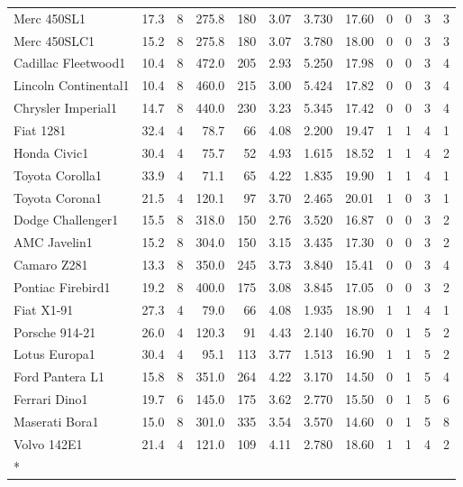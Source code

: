 \documentclass[a4paper, nobind]{templates/ociamthesis}
\begin{document}
\begin{landscape}
\begin{longtable}{lrrrrrrrrrrr}
Merc 450SL1 & 17.3 & 8 & 275.8 & 180 & 3.07 & 3.730 & 17.60 & 0 & 0 & 3 & 3\\
\addlinespace
Merc 450SLC1 & 15.2 & 8 & 275.8 & 180 & 3.07 & 3.780 & 18.00 & 0 & 0 & 3 & 3\\
Cadillac Fleetwood1 & 10.4 & 8 & 472.0 & 205 & 2.93 & 5.250 & 17.98 & 0 & 0 & 3 & 4\\
Lincoln Continental1 & 10.4 & 8 & 460.0 & 215 & 3.00 & 5.424 & 17.82 & 0 & 0 & 3 & 4\\
Chrysler Imperial1 & 14.7 & 8 & 440.0 & 230 & 3.23 & 5.345 & 17.42 & 0 & 0 & 3 & 4\\
Fiat 1281 & 32.4 & 4 & 78.7 & 66 & 4.08 & 2.200 & 19.47 & 1 & 1 & 4 & 1\\
\addlinespace
Honda Civic1 & 30.4 & 4 & 75.7 & 52 & 4.93 & 1.615 & 18.52 & 1 & 1 & 4 & 2\\
Toyota Corolla1 & 33.9 & 4 & 71.1 & 65 & 4.22 & 1.835 & 19.90 & 1 & 1 & 4 & 1\\
Toyota Corona1 & 21.5 & 4 & 120.1 & 97 & 3.70 & 2.465 & 20.01 & 1 & 0 & 3 & 1\\
Dodge Challenger1 & 15.5 & 8 & 318.0 & 150 & 2.76 & 3.520 & 16.87 & 0 & 0 & 3 & 2\\
AMC Javelin1 & 15.2 & 8 & 304.0 & 150 & 3.15 & 3.435 & 17.30 & 0 & 0 & 3 & 2\\
\addlinespace
Camaro Z281 & 13.3 & 8 & 350.0 & 245 & 3.73 & 3.840 & 15.41 & 0 & 0 & 3 & 4\\
Pontiac Firebird1 & 19.2 & 8 & 400.0 & 175 & 3.08 & 3.845 & 17.05 & 0 & 0 & 3 & 2\\
Fiat X1-91 & 27.3 & 4 & 79.0 & 66 & 4.08 & 1.935 & 18.90 & 1 & 1 & 4 & 1\\
Porsche 914-21 & 26.0 & 4 & 120.3 & 91 & 4.43 & 2.140 & 16.70 & 0 & 1 & 5 & 2\\
Lotus Europa1 & 30.4 & 4 & 95.1 & 113 & 3.77 & 1.513 & 16.90 & 1 & 1 & 5 & 2\\
\addlinespace
Ford Pantera L1 & 15.8 & 8 & 351.0 & 264 & 4.22 & 3.170 & 14.50 & 0 & 1 & 5 & 4\\
Ferrari Dino1 & 19.7 & 6 & 145.0 & 175 & 3.62 & 2.770 & 15.50 & 0 & 1 & 5 & 6\\
Maserati Bora1 & 15.0 & 8 & 301.0 & 335 & 3.54 & 3.570 & 14.60 & 0 & 1 & 5 & 8\\
Volvo 142E1 & 21.4 & 4 & 121.0 & 109 & 4.11 & 2.780 & 18.60 & 1 & 1 & 4 & 2\\*
\end{longtable}
\end{landscape}
\end{document}
